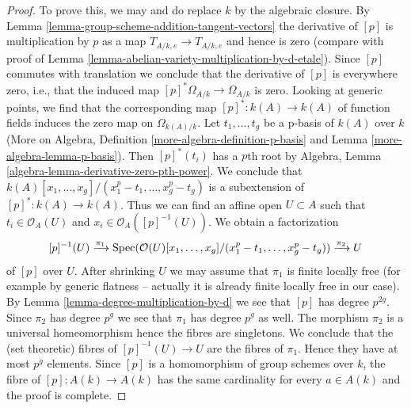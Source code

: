 \begin{proof}
To prove this, we may and do replace $k$ by the algebraic closure.
By Lemma \ref{lemma-group-scheme-addition-tangent-vectors}
the derivative of $[p]$ is multiplication by $p$ as a map
$T_{A/k, e} \to T_{A/k, e}$ and hence is zero (compare
with proof of Lemma \ref{lemma-abelian-variety-multiplication-by-d-etale}).
Since $[p]$ commutes with translation we conclude that the derivative of $[p]$
is everywhere zero, i.e., that the induced map
$[p]^*\Omega_{A/k} \to \Omega_{A/k}$ is zero.
Looking at generic points, we find that
the corresponding map $[p]^* : k(A) \to k(A)$
of function fields induces the zero map on $\Omega_{k(A)/k}$.
Let $t_1, \ldots, t_g$ be a p-basis of $k(A)$ over $k$
(More on Algebra, Definition \ref{more-algebra-definition-p-basis} and
Lemma \ref{more-algebra-lemma-p-basis}). Then $[p]^*(t_i)$
has a $p$th root by
Algebra, Lemma \ref{algebra-lemma-derivative-zero-pth-power}.
We conclude that
$k(A)[x_1, \ldots, x_g]/(x_1^p - t_1, \ldots, x_g^p - t_g)$ is a subextension
of $[p]^* : k(A) \to k(A)$.
Thus we can find an affine open $U \subset A$ such that
$t_i \in \mathcal{O}_A(U)$ and $x_i \in \mathcal{O}_A([p]^{-1}(U))$.
We obtain a factorization
$$
[p]^{-1}(U)
\xrightarrow{\pi_1}
\mathop{\mathrm{Spec}}(\mathcal{O}(U)[x_1, \ldots, x_g]/(x_1^p - t_1, \ldots, x_g^p - t_g))
\xrightarrow{\pi_2}
U
$$
of $[p]$ over $U$. After shrinking $U$ we may assume that $\pi_1$
is finite locally free (for example by generic flatness -- actually it is
already finite locally free in our case).
By Lemma \ref{lemma-degree-multiplication-by-d} we see that
$[p]$ has degree $p^{2g}$. Since $\pi_2$
has degree $p^g$ we see that $\pi_1$ has degree $p^g$ as well.
The morphism $\pi_2$ is a universal homeomorphism hence the fibres are
singletons. We conclude that the (set theoretic) fibres of $[p]^{-1}(U) \to U$
are the fibres of $\pi_1$. Hence they
have at most $p^g$ elements. Since $[p]$ is a homomorphism of group
schemes over $k$, the fibre of $[p] : A(k) \to A(k)$ has the
same cardinality for every $a \in A(k)$ and the proof is complete.
\end{proof}

